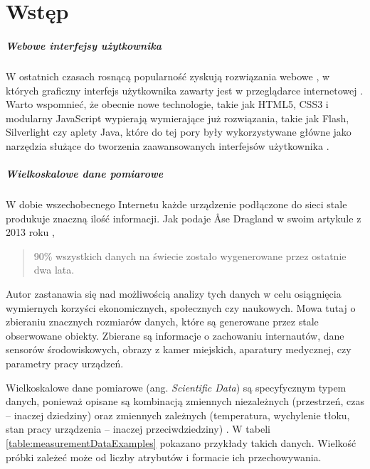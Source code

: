 \chapter{Wst\k{e}p}

\paragraph{Webowe interfejsy użytkownika}

W ostatnich czasach rosnącą popularność zyskują rozwiązania webowe \cite{dziennik-internautow}, w których graficzny interfejs użytkownika zawarty jest w przeglądarce internetowej \cite{what-is-web-app}.
Warto wspomnieć, że obecnie nowe technologie, takie jak HTML5, CSS3 i modularny JavaScript wypierają wymierające już rozwiązania, takie jak Flash, Silverlight czy aplety Java, które do tej pory były wykorzystywane główne jako narzędzia służące do tworzenia zaawansowanych interfejsów użytkownika \cite{jobs2010thoughts}.

\paragraph{Wielkoskalowe dane pomiarowe}

W dobie wszechobecnego Internetu każde urządzenie podłączone do sieci stale produkuje znaczną ilość informacji.
Jak podaje Åse Dragland w swoim artykule z 2013 roku \cite{dragland2013big},
\begin{quote}
	90\% wszystkich danych na świecie zostało wygenerowane przez ostatnie dwa lata.
\end{quote}
Autor zastanawia się nad możliwością analizy tych danych w celu osiągnięcia wymiernych korzyści ekonomicznych, społecznych czy naukowych.
Mowa tutaj o zbieraniu znacznych rozmiarów danych, które są generowane przez stale obserwowane obiekty.
Zbierane są informacje o zachowaniu internautów, dane sensorów środowiskowych, obrazy z kamer miejskich, aparatury medycznej, czy parametry pracy urządzeń.


Wielkoskalowe dane pomiarowe (ang. \textit{Scientific Data}) są specyfycznym typem danych, ponieważ opisane są kombinacją zmiennych niezależnych (przestrzeń, czas -- inaczej dziedziny) oraz zmiennych zależnych (temperatura, wychylenie tłoku, stan pracy urządzenia -- inaczej przeciwdziedziny) \cite{Hauser12VisTutorial}.
W tabeli \ref{table:measurementDataExamples} pokazano przykłady takich danych.
Wielkość próbki zależeć może od liczby atrybutów i formacie ich przechowywania.

